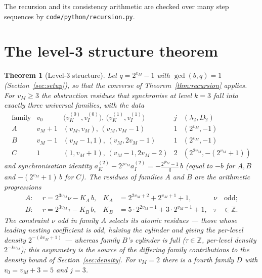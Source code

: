 \documentclass[11pt,reqno]{amsart}
\theoremstyle{plain}
\newtheorem{theorem}{Theorem}[section]
\theoremstyle{definition}
\theoremstyle{remark}
\newcommand{\Z}{\mathbb{Z}}
\newcommand{\vk}{v_{K}}
\newcommand{\vi}{v_{I}}
\newcommand{\aK}{a_{K}}
\newcommand{\aI}{a_{I}}
\newcommand{\vM}{v_{M}}
\newcommand{\srcpath}[1]{\nolinkurl{#1}}
\begin{document}
The recursion and its consistency arithmetic are checked over many step
sequences by \srcpath{code/python/recursion.py}.

\section{The level-3 structure theorem}\label{sec:stage3}

\begin{theorem}[Level-3 structure]\label{thm:stage3}
Let $q = 2^{\vM} - 1$ with $\gcd(b, q) = 1$ (Section~\ref{sec:setup}), so
that the converse of Theorem~\ref{thm:recursion} applies. For $\vM \ge 3$ the
obstruction residues that
synchronise at level $k = 3$ fall into exactly three universal families,
with the data
\[
\renewcommand{\arraystretch}{1.2}
\begin{array}{c|c|c|c|c}
\text{family} & v_0 & \big(\vk^{(0)},\vi^{(0)}\big),\,\big(\vk^{(1)},\vi^{(1)}\big)
 & j & (\lambda_2, D_2) \\ \hline
A & \vM + 1 & (\vM, \vM),\,(\vM, \vM - 1) & 1 & (2^{\vM}, -1) \\
B & \vM - 1 & (\vM - 1, 1),\,(\vM, 2\vM - 1) & 1 & (2^{\vM}, -1) \\
C & 1       & (1, \vM + 1),\,(\vM - 1, 2\vM - 2) & 2 & (2^{2\vM}, -(2^{\vM}+1))
\end{array}
\]
and synchronisation identity
$\aK^{(2)} - 2^{j\vM}\aI^{(2)} = -\frac{2^{j\vM} - 1}{q}\, b$
(equal to $-b$ for $A, B$ and $-(2^{\vM} + 1)\, b$ for $C$). The residues of
families $A$ and $B$ are the arithmetic progressions
\[
\begin{aligned}
A:\ &\ r = 2^{3\vM}\nu - K_A\, b, & K_A &= 2^{2\vM + 2} + 2^{\vM + 1} + 1, & \nu &\ \text{odd};\\
B:\ &\ r = 2^{3\vM}\tau - K_B\, b, & K_B &= 5\cdot 2^{2\vM - 1} + 3\cdot 2^{\vM - 1} + 1, & \tau &\in \Z.
\end{aligned}
\] The constraint $\nu$ odd in family $A$ selects its atomic residues --- those
whose leading nesting coefficient is odd, halving the cylinder and giving the
per-level density $2^{-(k\vM + 1)}$ --- whereas family $B$'s cylinder is full
($\tau \in \Z$, per-level density $2^{-k\vM}$); this asymmetry is the source of
the differing family contributions to the density bound of
Section~\ref{sec:density}. For $\vM = 2$ there is a fourth family
$D$ with $v_0 = \vM + 3 = 5$ and $j = 3$.
\end{theorem}
\end{document}
